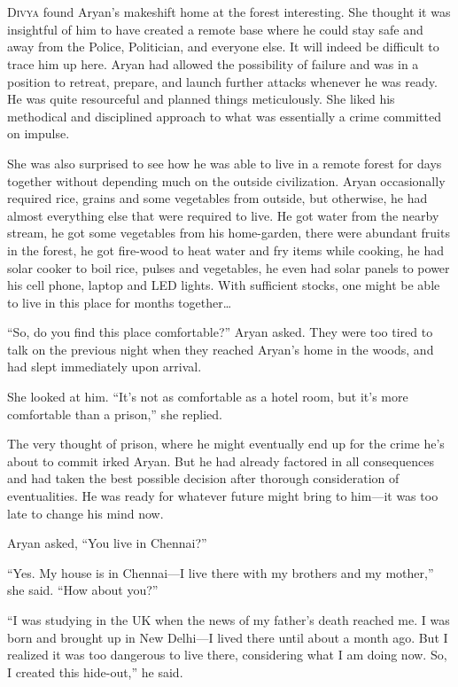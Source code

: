\chapter{}

\lettrine{D}{ivya} found Aryan's makeshift home at the forest interesting. She thought it was
insightful of him to have created a remote base where he could stay safe and
away from the Police, Politician, and everyone else. It will indeed be difficult
to trace him up here. Aryan had allowed the possibility of failure and was in a
position to retreat, prepare, and launch further attacks whenever he was ready.
He was quite resourceful and planned things meticulously. She liked his
methodical and disciplined approach to what was essentially a crime committed on
impulse.

She was also surprised to see how he was able to live in a remote forest for
days together without depending much on the outside civilization. Aryan
occasionally required rice, grains and some vegetables from outside, but
otherwise, he had almost everything else that were required to live. He got
water from the nearby stream, he got some vegetables from his home-garden, there
were abundant fruits in the forest, he got fire-wood to heat water and fry items
while cooking, he had solar cooker to boil rice, pulses and vegetables, he even
had solar panels to power his cell phone, laptop and LED lights. With sufficient
stocks, one might be able to live in this place for months together…

“So, do you find this place comfortable?” Aryan asked. They were too tired to
talk on the previous night when they reached Aryan's home in the woods, and had
slept immediately upon arrival.

She looked at him. “It's not as comfortable as a hotel room, but it's more
comfortable than a prison,” she replied.

The very thought of prison, where he might eventually end up for the crime he's
about to commit irked Aryan. But he had already factored in all consequences and
had taken the best possible decision after thorough consideration of
eventualities. He was ready for whatever future might bring to him—it was too
late to change his mind now.

Aryan asked, “You live in Chennai?”

“Yes. My house is in Chennai—I live there with my brothers and my mother,” she
said. “How about you?”

“I was studying in the UK when the news of my father's death reached me. I was
born and brought up in New Delhi—I lived there until about a month ago. But I
realized it was too dangerous to live there, considering what I am doing now.
So, I created this hide-out,” he said.

